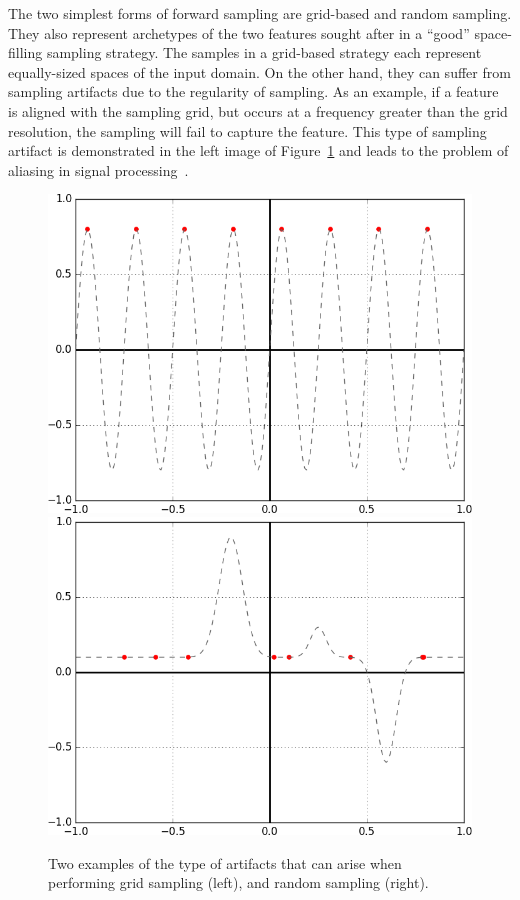 The two simplest forms of forward sampling are grid-based and random sampling.
%
They also represent archetypes of the two features sought after in a ``good'' space-filling sampling strategy.
%
The samples in a grid-based strategy each represent equally-sized spaces of the input domain.
%
On the other hand, they can suffer from sampling artifacts due to the regularity of sampling.
%
As an example, if a feature is aligned with the sampling grid, but occurs at a frequency greater than the grid resolution, the sampling will fail to capture the feature.
%
This type of sampling artifact is demonstrated in the left image of Figure~\ref{fig:samplingArtifacts} and leads to the problem of aliasing in signal processing~\cite{Crow1977}.
%

\begin{figure}[t]
  \centering
  \includegraphics[width=.45\textwidth]{figs/chap3/sampledSine}\qquad
  \includegraphics[width=.45\textwidth]{figs/chap3/sampledGaussian}
  \caption[1D Sampling Artifacts]{Two examples of the type of artifacts that can
  arise when performing grid sampling (left), and random sampling (right).}
  \label{fig:samplingArtifacts}
\end{figure}

